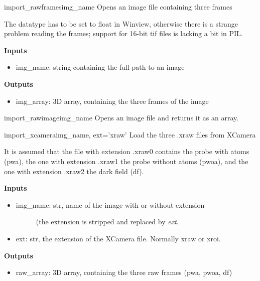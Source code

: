 \documentclass[letterpaper,10pt,english]{manual}
\begin{document}
\hypertarget{odysseus.imageio.import_rawframes}{}\begin{funcdesc}{import\_rawframes}{img\_name}
Opens an image file containing three frames

The datatype has to be set to float in Winview, otherwise there is a
strange problem reading the frames; support for 16-bit tif files is
lacking a bit in PIL.

\textbf{Inputs}
\begin{itemize}
\item {} 
img\_name: string containing the full path to an image

\end{itemize}

\textbf{Outputs}
\begin{itemize}
\item {} 
img\_array: 3D array, containing the three frames of the image

\end{itemize}
\end{funcdesc}

\hypertarget{odysseus.imageio.import_rawimage}{}\begin{funcdesc}{import\_rawimage}{img\_name}
Opens an image file and returns it as an array.
\end{funcdesc}

\hypertarget{odysseus.imageio.import_xcamera}{}\begin{funcdesc}{import\_xcamera}{img\_name, ext='xraw'}
Load the three .xraw files from XCamera

It is assumed that the file with extension .xraw0 contains the probe
with atoms (pwa), the one with extension .xraw1 the probe without atoms
(pwoa), and the one with extension .xraw2 the dark field (df).

\textbf{Inputs}
\begin{itemize}
\item {} \begin{description}
\item[img\_name: str, name of the image with or without extension] \leavevmode
(the extension is stripped and replaced by \emph{ext}.

\end{description}

\item {} 
ext: str, the extension of the XCamera file. Normally xraw or xroi.

\end{itemize}

\textbf{Outputs}
\begin{itemize}
\item {} 
raw\_array: 3D array, containing the three raw frames (pwa, pwoa, df)

\end{itemize}
\end{funcdesc}
\end{document}
